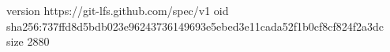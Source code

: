 version https://git-lfs.github.com/spec/v1
oid sha256:737ffd8d5bdb023e96243736149693e5ebed3e11cada52f1b0cf8cf824f2a3dc
size 2880
